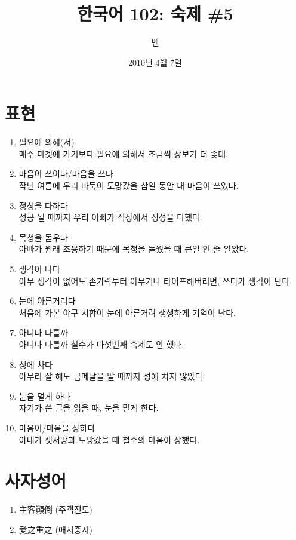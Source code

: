 \documentclass[11pt]{article}
\title{한국어 102: 숙제 \#5}
\author{벤}
\date{2010년 4월 7일}
\begin{document}
\maketitle
\thispagestyle{empty}
\pagestyle{empty}

\section{표현}
\begin{enumerate}
\item 필요에 의해(서) \\
  매주 마겟에 가기보다 필요에 의해서 조금씩 장보기 더 좇대.
\item 마음이 쓰이다/마음을 쓰다 \\
  작년 여름에 우리 바둑이 도망갔을 삼일 동안 내 마음이 쓰였다.
\item 정성을 다하다 \\
  성공 될 때까지 우리 아빠가 직장에서 정성을 다했다.
\item 목청을 돋우다 \\
  아빠가 원래 조용하기 때문에 목청을 돋웠을 때 큰일 인 줄 알았다.
\item 생각이 나다 \\
  아무 생각이 없어도 손가락부터 아무거나 타이프해버리면, 쓰다가 생각이 난다.
\item 눈에 아른거리다 \\
  처음에 가본 야구 시합이 눈에 아른거려 생생하게 기억이 난다.
\item 아니나 다를까 \\
  아니나 다를까 철수가 다섯번째 숙제도 안 했다.
\item 성에 차다 \\
  아무리 잘 해도 금메달을 딸 때까지 성에 차지 않았다.
\item 눈을 멀게 하다 \\
  자기가 쓴 글을 읽을 때, 눈을 멀게 한다.
\item 마음이/마음을 상하다 \\
  아내가 셋서방과 도망갔을 때 철수의 마음이 상했다.
\end{enumerate}

\section{사자성어}
\begin{enumerate}
\item 主客顚倒 (주객전도) \\
\item 愛之重之 (애지중지) \\
\end{enumerate}
\end{document}

